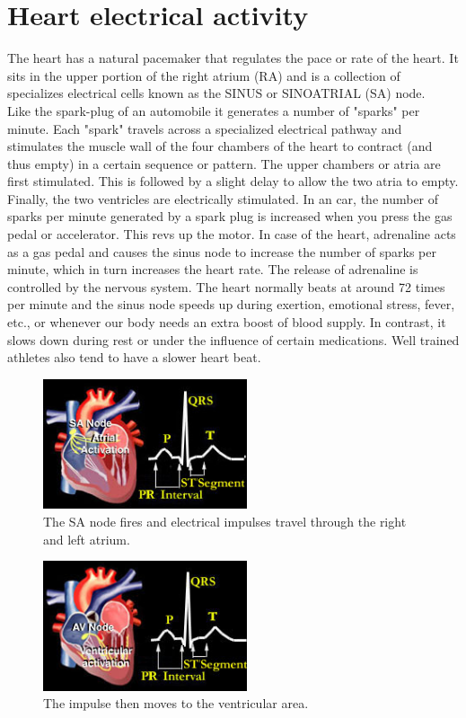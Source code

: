 \section{Heart electrical activity}
The heart has a natural pacemaker that regulates the pace or rate of the heart. It sits in the upper portion of the right atrium (RA) and is a collection of specializes electrical cells known as the SINUS or SINOATRIAL (SA) node.\\
Like the spark-plug of an automobile it generates a number of "sparks" per minute. Each "spark" travels across a specialized electrical pathway and stimulates the muscle wall of the four chambers of the heart to contract (and thus empty) in a certain sequence or pattern. The upper chambers or atria are first stimulated. This is followed by a slight delay to allow the two atria to empty. Finally, the two ventricles are electrically stimulated. In an car, the number of sparks per minute generated by a spark plug is increased when you press the gas pedal or accelerator. This revs up the motor. In case of the heart, adrenaline acts as a gas pedal and causes the sinus node to increase the number of sparks per minute, which in turn increases the heart rate. The release of adrenaline is controlled by the nervous system. The heart normally beats at around 72 times per minute and the sinus node speeds up during exertion, emotional stress, fever, etc., or whenever our body needs an extra boost of blood supply. In contrast, it slows down during rest or under the influence of certain medications. Well trained athletes also tend to have a slower heart beat.\\

\begin{figure}[ht!]
	\centering
	\includegraphics[width=60mm]{figures/ch2/3.png}
	\caption{The SA node fires and electrical impulses travel through the right and left atrium. \label{overflow}}
	\label{fig2.3}
\end{figure}
\begin{figure}[ht!]
	\centering
	\includegraphics[width=60mm]{figures/ch2/4.png}
	\caption{The impulse then moves to the ventricular area.}
	\label{fig2.4}
\end{figure}

